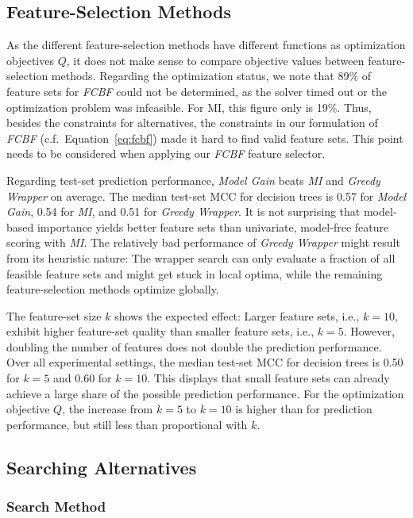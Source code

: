 \documentclass{article}
\theoremstyle{definition}
\begin{document}
\subsection{Feature-Selection Methods}

As the different feature-selection methods have different functions as optimization objectives $Q$, it does not make sense to compare objective values between feature-selection methods.
Regarding the optimization status, we note that 89\% of feature sets for \emph{FCBF} could not be determined, as the solver timed out or the optimization problem was infeasible.
For MI, this figure only is 19\%.
Thus, besides the constraints for alternatives, the constraints in our formulation of \emph{FCBF} (c.f.~Equation~\ref{eq:fcbf}) made it hard to find valid feature sets.
This point needs to be considered when applying our \emph{FCBF} feature selector.

Regarding test-set prediction performance, \emph{Model Gain} beats \emph{MI} and \emph{Greedy Wrapper} on average.
The median test-set MCC for decision trees is 0.57 for \emph{Model Gain}, 0.54 for \emph{MI}, and 0.51 for \emph{Greedy Wrapper}.
It is not surprising that model-based importance yields better feature sets than univariate, model-free feature scoring with \emph{MI}.
The relatively bad performance of \emph{Greedy Wrapper} might result from its heuristic nature:
The wrapper search can only evaluate a fraction of all feasible feature sets and might get stuck in local optima, while the remaining feature-selection methods optimize globally.

The feature-set size $k$ shows the expected effect:
Larger feature sets, i.e., $k=10$, exhibit higher feature-set quality than smaller feature sets, i.e., $k=5$.
However, doubling the number of features does not double the prediction performance.
Over all experimental settings, the median test-set MCC for decision trees is 0.50 for $k=5$ and 0.60 for $k=10$.
This displays that small feature sets can already achieve a large share of the possible prediction performance.
For the optimization objective $Q$, the increase from $k=5$ to $k=10$ is higher than for prediction performance, but still less than proportional with $k$.

\subsection{Searching Alternatives}

\subsubsection{Search Method}
\end{document}

